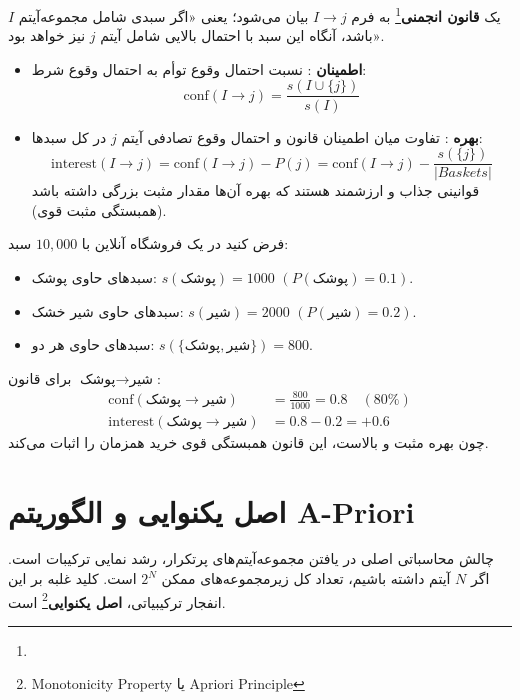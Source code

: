 \begin{definition}
یک \textbf{قانون انجمنی}\footnote{} به فرم $I \to j$ بیان می‌شود؛ یعنی «اگر سبدی شامل مجموعه‌آیتم $I$ باشد، آنگاه این سبد با احتمال بالایی شامل آیتم $j$ نیز خواهد بود».
\begin{itemize}
    \item \textbf{اطمینان }: نسبت احتمال وقوع توأم به احتمال وقوع شرط:
    \begin{equation}
    \text{conf}(I \to j) = \frac{s(I \cup \{j\})}{s(I)}
    \end{equation}
    
    \item \textbf{بهره }: تفاوت میان اطمینان قانون و احتمال وقوع تصادفی آیتم $j$ در کل سبدها:
    \begin{equation}
    \text{interest}(I \to j) = \text{conf}(I \to j) - P(j) = \text{conf}(I \to j) - \frac{s(\{j\})}{|Baskets|}
    \end{equation}
    قوانینی جذاب و ارزشمند هستند که بهره آن‌ها مقدار مثبت بزرگی داشته باشد (همبستگی مثبت قوی).
\end{itemize}
\end{definition}

\begin{example}
فرض کنید در یک فروشگاه آنلاین با $10{,}000$ سبد:
\begin{itemize}
    \item سبدهای حاوی پوشک: $s(\text{پوشک}) = 1000$ $(P(\text{پوشک}) = 0.1)$.
    \item سبدهای حاوی شیر خشک: $s(\text{شیر}) = 2000$ $(P(\text{شیر}) = 0.2)$.
    \item سبدهای حاوی هر دو: $s(\{\text{پوشک}, \text{شیر}\}) = 800$.
\end{itemize}
برای قانون $\text{پوشک} \to \text{شیر}$:
\begin{align}
\text{conf}(\text{پوشک} \to \text{شیر}) &= \frac{800}{1000} = 0.8 \quad (80\%) \\
\text{interest}(\text{پوشک} \to \text{شیر}) &= 0.8 - 0.2 = +0.6
\end{align}
چون بهره مثبت و بالاست، این قانون همبستگی قوی خرید همزمان را اثبات می‌کند.
\end{example}

\section{اصل یکنوایی و الگوریتم A-Priori}
چالش محاسباتی اصلی در یافتن مجموعه‌آیتم‌های پرتکرار، رشد نمایی ترکیبات است. اگر $N$ آیتم داشته باشیم، تعداد کل زیرمجموعه‌های ممکن $2^N$ است.
کلید غلبه بر این انفجار ترکیبیاتی، \textbf{اصل یکنوایی}\footnote{Monotonicity Property یا Apriori Principle} است.

